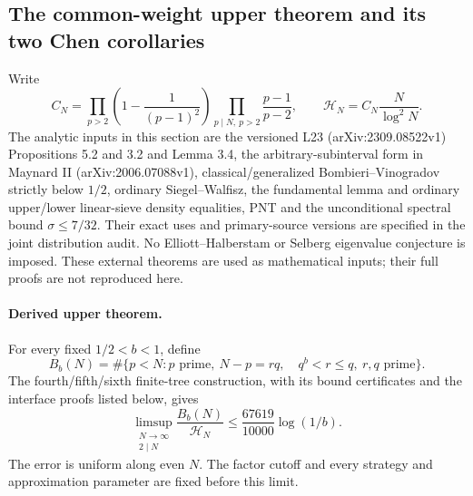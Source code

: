 \subsection{The common-weight upper theorem and its two Chen corollaries}
\label{sec:actual-k-joint-theorem}

Write
\[
 C_N=\prod_{p>2}\left(1-\frac1{(p-1)^2}\right)
          \prod_{p\mid N,\ p>2}\frac{p-1}{p-2},\qquad
 \mathcal H_N=C_N\frac{N}{\log^2N}.
\]
The analytic inputs in this section are the versioned L23
(arXiv:2309.08522v1) Propositions 5.2 and 3.2 and Lemma 3.4,
the arbitrary-subinterval form in Maynard II
(arXiv:2006.07088v1), classical/generalized Bombieri--Vinogradov
strictly below $1/2$, ordinary Siegel--Walfisz, the fundamental
lemma and ordinary upper/lower linear-sieve density equalities,
PNT and the unconditional spectral bound $\sigma\le7/32$.
Their exact uses and primary-source versions are specified in the
joint distribution audit. No Elliott--Halberstam or Selberg
eigenvalue conjecture is imposed. These external theorems are used
as mathematical inputs; their full proofs are not reproduced here.

\paragraph{Derived upper theorem.}
For every fixed $1/2<b<1$, define
\[
 B_b(N)=\#\{p<N:p\text{ prime},\ N-p=rq,\quad
                    q^b<r\le q,\ r,q\text{ prime}\}.
\]
The fourth/fifth/sixth finite-tree construction, with its bound
certificates and the interface proofs listed below, gives
\begin{equation}\label{eq:actual-k-joint-upper-theorem}
 \limsup_{\substack{N\to\infty\\2\mid N}}
       \frac{B_b(N)}{\mathcal H_N}
 \le\frac{67619}{10000}\log(1/b).
\end{equation}
The error is uniform along even $N$. The factor cutoff and every
strategy and approximation parameter are fixed before this limit.

